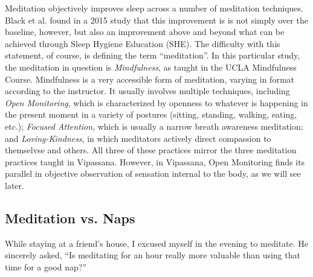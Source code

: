 \documentclass[a4paper, amsfonts, amssymb, amsmath, reprint, showkeys, nofootinbib, twoside]{revtex4-1}
\begin{document}
Meditation objectively improves sleep across a number of meditation techniques.
\cite{nagendra2012} Black et al. found in a 2015 study that this
improvement is is not simply over the baseline, however, but also an improvement
above and beyond what can be achieved through Sleep
Hygiene Education (SHE). \cite{black2015} The difficulty with this statement, of
course, is defining the term ``meditation''. In this particular study, the meditation
in question is \textit{Mindfulness}, as taught in the UCLA Mindfulness
Course. \cite{uclamaps} Mindfulness is a very accessible form of meditation, varying
in format according to the instructor. It usually involves multiple techniques,
including \textit{Open Monitoring}, which is characterized by
openness to whatever is happening in the present moment in a variety of postures
(sitting, standing, walking, eating, etc.); \textit{Focused Attention}, which is
usually a narrow breath awareness meditation; and \textit{Loving-Kindness}, in which
meditators actively direct compassion to themselvse and others. All three of these
practices mirror the three meditation practices taught in Vipassana. However, in Vipassana, Open
Monitoring finds its parallel in objective observation of sensation internal to the
body, as we will see later.


\subsection{Meditation vs. Naps}

While staying at a friend's house, I excused myself in the evening to meditate. He
sincerely asked, ``Is meditating for an hour really more valuable than using that
time for a good nap?''

\end{document}
